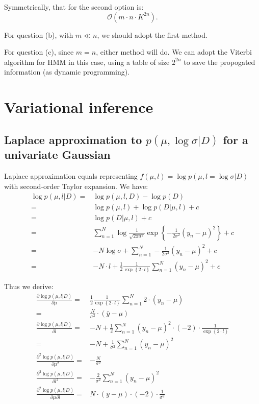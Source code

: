 \documentclass[UTF8]{ctexart}
\begin{document}
Symmetrically, that for the second option is:
$$\mathcal{O}(m\cdot n\cdot K^{2n}).$$

For question (b), with $m \ll n$, we should adopt the first method. 

For question (c), since $m=n$, either method will do.
We can adopt the Viterbi algorithm for HMM in this case, using a table of size $2^{2n}$ to save the propogated information (as dynamic programming). 

\newpage
\section{Variational inference}
\subsection{Laplace approximation to $p(\mu,\log \sigma|D)$ for a univariate Gaussian}
Laplace approximation equals representing $f(\mu,l)=\log p(\mu,l=\log \sigma|D)$ with second-order Taylor expansion. We have:
\begin{align}
\log p(\mu,l|D)=&\log p(\mu,l,D)-\log p(D)\nonumber \\
=&\log p(\mu,l) + \log p(D|\mu,l) + c \nonumber \\
=&\log p(D|\mu,l) + c \nonumber \\
=&\sum_{n=1}^{N}\log \frac{1}{\sqrt{2\pi\sigma^{2}}}\exp\left\{-\frac{1}{2\sigma^{2}}(y_{n}-\mu)^{2}  \right\}+c \nonumber \\
=&-N\log \sigma+\sum_{n=1}^{N}-\frac{1}{2\sigma^{2}}(y_{n}-\mu)^{2}+c\nonumber \\
=&-N\cdot l+\frac{1}{2}\frac{1}{\exp\left\{2\cdot l\right\}}\sum_{n=1}^{N}(y_{n}-\mu)^{2}+c \nonumber
\end{align}

Thus we derive:
\begin{align}
\frac{\partial \log p(\mu,l|D)}{\partial \mu}=&\frac{1}{2}\frac{1}{\exp\left\{2\cdot l\right\}}\sum_{n=1}^{N}2\cdot (y_{n}-\mu) \nonumber \\
=&\frac{N}{\sigma^{2}}\cdot (\bar{y}-\mu)\nonumber \\
\frac{\partial \log p(\mu,l|D)}{\partial l}=&-N + \frac{1}{2}\sum_{n=1}^{N}(y_{n}-\mu)^{2}\cdot (-2)\cdot \frac{1}{\exp\left\{2\cdot l  \right\}} \nonumber \\
=&-N+\frac{1}{\sigma^{2}}\sum_{n=1}^{N}(y_{n}-\mu)^{2} \nonumber \\
\frac{\partial^{2} \log p(\mu,l|D)}{\partial \mu^{2}}=&-\frac{N}{\sigma^{2}} \nonumber \\
\frac{\partial^{2} \log p(\mu,l|D)}{\partial l^{2}}=&-\frac{2}{\sigma^{2}}\sum_{n=1}^{N}(y_{n}-\mu)^{2} \nonumber \\
\frac{\partial^{2} \log p(\mu,l|D)}{\partial \mu \partial l}=&N\cdot (\bar{y}-\mu)\cdot (-2) \cdot \frac{1}{\sigma^{2}} \nonumber
\end{align}
\end{document}
